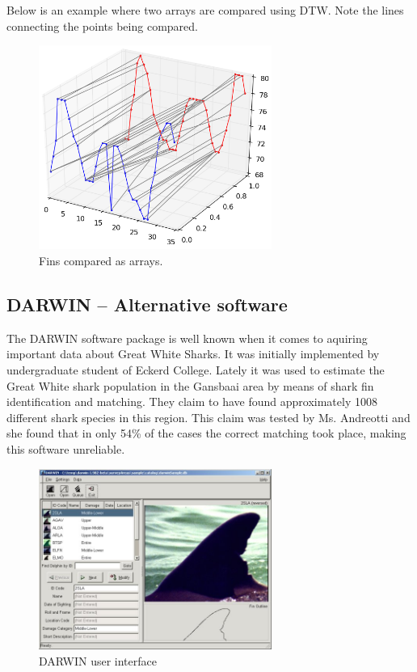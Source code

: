 \documentclass[a4paper,10pt]{article}
\begin{document}
Below is an example where two arrays are compared using DTW. Note the lines
connecting the points being compared.  \begin{figure}[H]
 \centering
 \includegraphics[width=3in]{dtw.jpg}
 \caption{Fins compared as arrays.}
 \label{dtw}
\end{figure}

\newpage
\subsection{DARWIN -- Alternative software}
The DARWIN\cite{Darwin} software package is well known when it comes to
aquiring important data about Great White Sharks.  It was initially implemented
by undergraduate student of
Eckerd College.
Lately it was used to estimate the Great White shark population in the
Gansbaai area by means of shark fin identification and matching.  They claim to
have found approximately
1008 different shark species in this region.  This
claim was tested by Ms. Andreotti and she found that in only
54\% of the cases the correct matching took place, making this software
unreliable.

\begin{figure}[H]
 \centering
 \includegraphics[width=3in]{Darwin.jpg}
 \caption{DARWIN user interface}
\end{figure}
\end{document}
